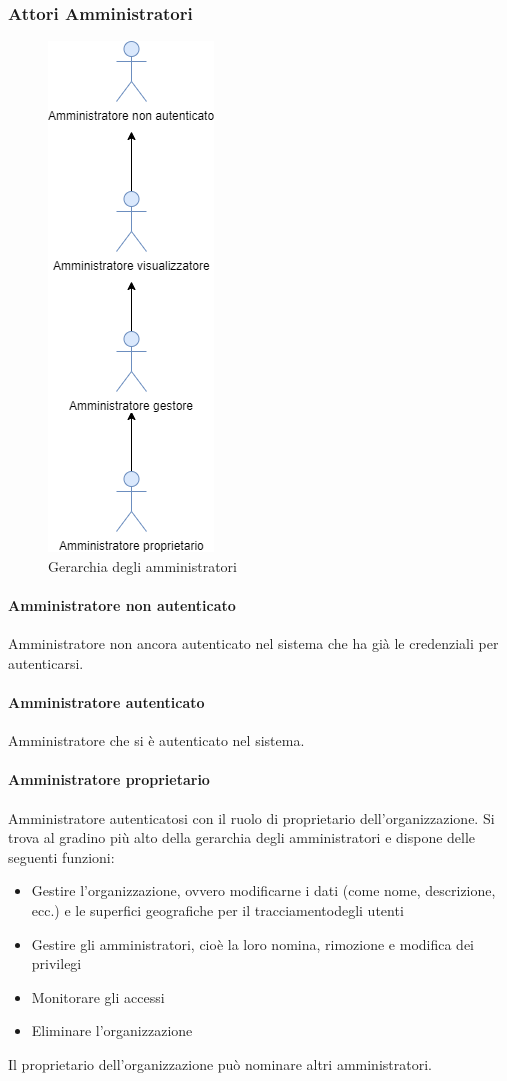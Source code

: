 \subsubsection{Attori Amministratori}
\begin{figure}[h]
  \caption{Gerarchia degli amministratori}
  \centering
    \includegraphics[scale=0.6]{Sezioni/UseCase/Immagini/Amministratori.png}
\end{figure}


\paragraph{Amministratore non autenticato}
Amministratore non ancora autenticato nel sistema che ha già le credenziali per autenticarsi.
\paragraph{Amministratore autenticato}
Amministratore che si è autenticato nel sistema.
\paragraph{Amministratore proprietario}
Amministratore autenticatosi con il ruolo di proprietario dell'organizzazione.
Si trova al gradino più alto della gerarchia degli amministratori e dispone delle seguenti funzioni:
\begin{itemize}
\item Gestire l'organizzazione, ovvero modificarne i dati (come nome, descrizione, ecc.) e le superfici geografiche per il tracciamentodegli utenti
\item Gestire gli amministratori, cioè la loro nomina, rimozione e modifica dei privilegi
\item Monitorare gli accessi
\item Eliminare l'organizzazione
\end{itemize}
Il proprietario dell'organizzazione può nominare altri amministratori.
